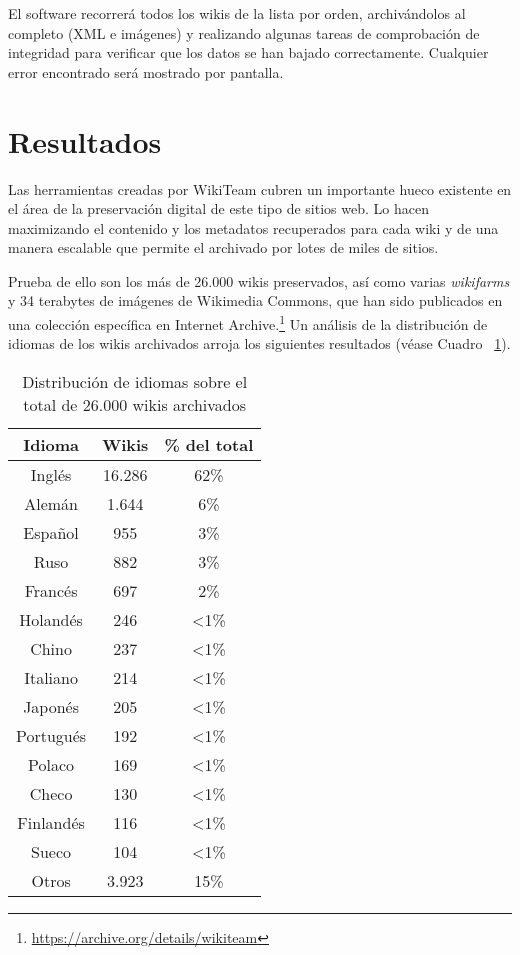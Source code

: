 \documentclass[14pt,twocolumn]{article}
\begin{document}
El software recorrerá todos los wikis de la lista por orden, archivándolos al completo (XML e imágenes) y realizando algunas tareas de comprobación de integridad para verificar que los datos se han bajado correctamente. Cualquier error encontrado será mostrado por pantalla.

\section{Resultados}

Las herramientas creadas por WikiTeam cubren un importante hueco existente en el área de la preservación digital de este tipo de sitios web. Lo hacen maximizando el contenido y los metadatos recuperados para cada wiki y de una manera escalable que permite el archivado por lotes de miles de sitios.

Prueba de ello son los más de 26.000 wikis preservados, así como varias \textit{wikifarms} y 34 terabytes de imágenes de Wikimedia Commons, que han sido publicados en una colección específica en Internet Archive.\footnote{\href{https://archive.org/details/wikiteam}{https://archive.org/details/wikiteam}} Un análisis de la distribución de idiomas de los wikis archivados arroja los siguientes resultados (véase Cuadro ~\ref{table:idiomas}).

\begin{table}[]
\centering
\caption{Distribución de idiomas sobre el total de 26.000 wikis archivados}
\label{table:idiomas}
\begin{tabular}{|c|c|c|}
\hline
\multicolumn{1}{|c|}{\textbf{Idioma}} & 
\multicolumn{1}{|c|}{\textbf{Wikis}} & 
\multicolumn{1}{|c|}{\textbf{\% del total}} \\ \hline
	Inglés & 16.286 & 62\% \\ \hline
	Alemán & 1.644 & 6\% \\ \hline
	Español & 955 & 3\% \\ \hline
	Ruso & 882 & 3\% \\ \hline
	Francés & 697 & 2\% \\ \hline
	Holandés & 246 & \textless1\% \\ \hline
	Chino & 237 & \textless1\% \\ \hline
	Italiano & 214 & \textless1\% \\ \hline
	Japonés & 205 & \textless1\% \\ \hline
	Portugués & 192 & \textless1\% \\ \hline
	Polaco & 169 & \textless1\% \\ \hline
	Checo & 130 & \textless1\% \\ \hline
	Finlandés & 116 & \textless1\% \\ \hline
	Sueco & 104 & \textless1\% \\ \hline
	Otros & 3.923 & 15\% \\ \hline
\end{tabular}
\end{table}
\end{document}
